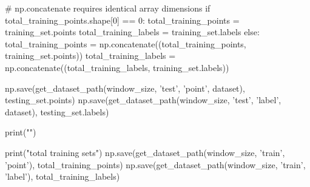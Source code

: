 \begin{pythoncode}
            # np.concatenate requires identical array dimensions
            if total_training_points.shape[0] == 0:
                total_training_points = training_set.points
                total_training_labels = training_set.labels
            else:
                total_training_points = np.concatenate((total_training_points, training_set.points))
                total_training_labels = np.concatenate((total_training_labels, training_set.labels))

            np.save(get_dataset_path(window_size, 'test', 'point', dataset), testing_set.points)
            np.save(get_dataset_path(window_size, 'test', 'label', dataset), testing_set.labels)

            print("\nInitialized")

        print("\n\nSaving total training sets\n")
        np.save(get_dataset_path(window_size, 'train', 'point'), total_training_points)
        np.save(get_dataset_path(window_size, 'train', 'label'), total_training_labels)

\end{pythoncode}
